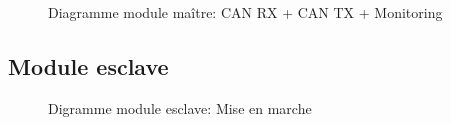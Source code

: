 		\begin{figure}[H]
			\centering
			\caption{Diagramme module maître: CAN RX + CAN TX + Monitoring }
			\label{fig:diagrammefonctionnelcanmonitoring}
		\end{figure}

	\subsection{Module esclave}

		\begin{figure}[H]
			\centering
			\caption{Digramme module esclave: Mise en marche}
			\label{fig:diagrammefonctionnelslavemiseenmarche}
		\end{figure}

